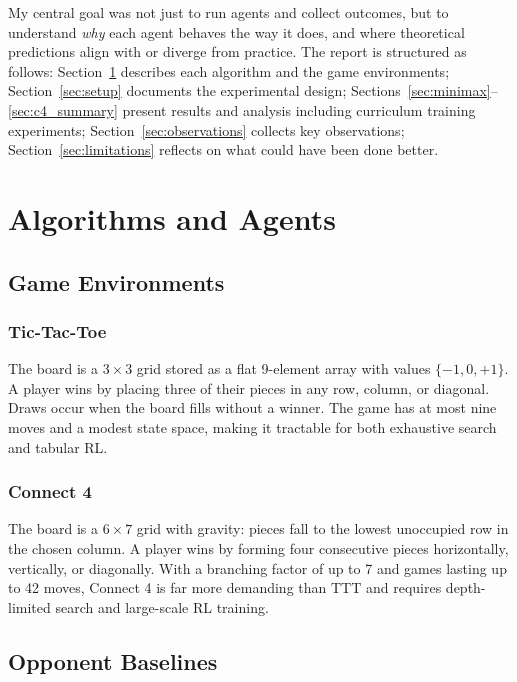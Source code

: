 \documentclass[11pt,a4paper]{article}
\begin{document}
My central goal was not just to run agents and collect outcomes, but to understand \emph{why} each
agent behaves the way it does, and where theoretical predictions align with or diverge from practice.
The report is structured as follows: Section~\ref{sec:agents} describes each algorithm and the
game environments; Section~\ref{sec:setup} documents the experimental design; Sections~\ref{sec:minimax}--\ref{sec:c4_summary}
present results and analysis including curriculum training experiments;
Section~\ref{sec:observations} collects key observations; Section~\ref{sec:limitations} reflects on
what could have been done better.

\section{Algorithms and Agents}
\label{sec:agents}

\subsection{Game Environments}

\subsubsection{Tic-Tac-Toe}
The board is a $3 \times 3$ grid stored as a flat 9-element array with values $\{-1, 0, +1\}$.
A player wins by placing three of their pieces in any row, column, or diagonal. Draws occur when the
board fills without a winner. The game has at most nine moves and a modest state space, making it
tractable for both exhaustive search and tabular RL.

\subsubsection{Connect 4}
The board is a $6 \times 7$ grid with gravity: pieces fall to the lowest unoccupied row in the chosen
column. A player wins by forming four consecutive pieces horizontally, vertically, or diagonally.
With a branching factor of up to 7 and games lasting up to 42 moves, Connect 4 is far more demanding
than TTT and requires depth-limited search and large-scale RL training.

\subsection{Opponent Baselines}
\end{document}
